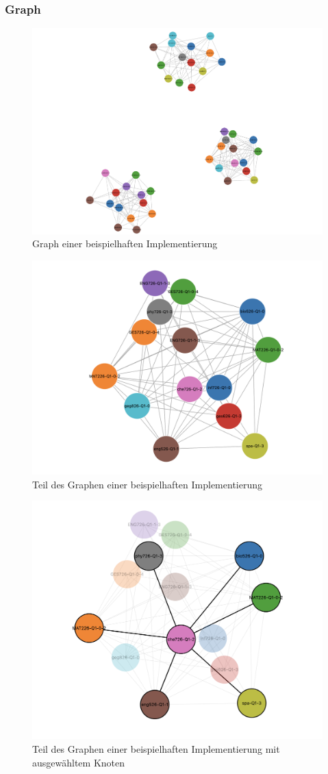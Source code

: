 \subsubsection*{Graph}
\begin{figure}[H]
    \centering
    \includegraphics[width=0.5\linewidth]{docs/graphics/graph-all.png}
    \caption{Graph einer beispielhaften Implementierung}
    \label{fig:graph1}
\end{figure}
\begin{figure}[H]
    \centering
    \includegraphics[width=0.5\linewidth]{docs/graphics/graph-detail.png}
    \caption{Teil des Graphen einer beispielhaften Implementierung}
    \label{fig:graph2}
\end{figure}
\begin{figure}[H]
    \centering
    \includegraphics[width=0.5\linewidth]{docs/graphics/graph-detail-selected.png}
    \caption{Teil des Graphen einer beispielhaften Implementierung mit ausgewähltem Knoten}
    \label{fig:graph3}
\end{figure}


